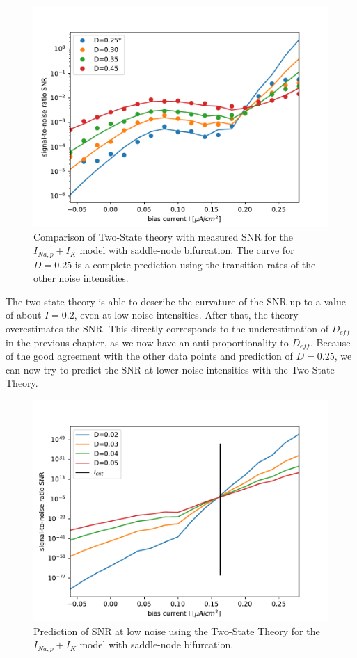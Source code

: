 \documentclass[12pt,a4paper]{article}
\begin{document}
\begin{figure}[H]
	\centering
	\includegraphics[scale=1]{snrtwostateneurcorsh5.pdf}\caption{Comparison of Two-State theory with measured SNR for the $I_{Na,p}+I_K$ model with saddle-node bifurcation. The curve for $D=0.25$ is a complete prediction using the transition rates of the other noise intensities.}
	\label{specneurtst}
\end{figure}
The two-state theory is able to describe the curvature of the SNR up to a value of about $I=0.2$, even at low noise intensities. After that, the theory overestimates the SNR. This directly corresponds to the underestimation of $D_{eff}$ in the previous chapter, as we now have an anti-proportionality to $D_{eff}$.
Because of the good agreement with the other data points and prediction of $D=0.25$, we can now try to predict the SNR at lower noise intensities with the Two-State Theory.
\begin{figure}[H]
	\centering
	\includegraphics[scale=1]{snrpredneur2.pdf}\caption{Prediction of SNR at low noise  using the Two-State Theory for the $I_{Na,p}+I_K$ model with saddle-node bifurcation.}
	\label{snrpredsn}
\end{figure}
\end{document}
